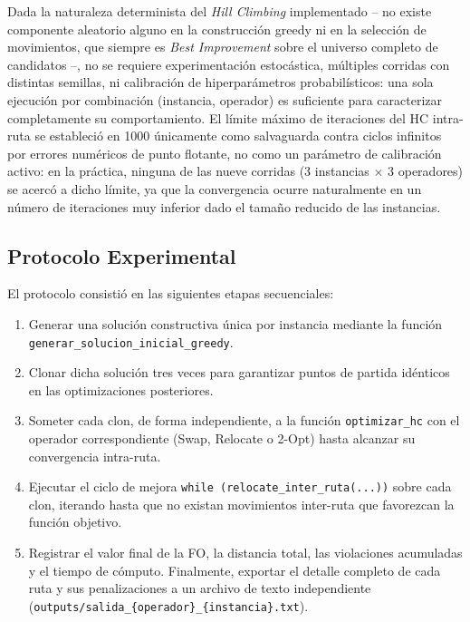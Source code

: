 \documentclass[letter, 10pt]{article}
\begin{document}
Dada la naturaleza determinista del \textit{Hill Climbing} implementado -- no existe componente aleatorio alguno en la construcci\'on greedy ni en la selecci\'on de movimientos, que siempre es \textit{Best Improvement} sobre el universo completo de candidatos --, no se requiere experimentaci\'on estoc\'astica, m\'ultiples corridas con distintas semillas, ni calibraci\'on de hiperpar\'ametros probabil\'isticos: una sola ejecuci\'on por combinaci\'on (instancia, operador) es suficiente para caracterizar completamente su comportamiento. El l\'imite m\'aximo de iteraciones del HC intra-ruta se estableci\'o en 1000 \'unicamente como salvaguarda contra ciclos infinitos por errores num\'ericos de punto flotante, no como un par\'ametro de calibraci\'on activo: en la pr\'actica, ninguna de las nueve corridas (3 instancias $\times$ 3 operadores) se acerc\'o a dicho l\'imite, ya que la convergencia ocurre naturalmente en un n\'umero de iteraciones muy inferior dado el tama\~no reducido de las instancias.

\subsection{Protocolo Experimental}

El protocolo consisti\'o en las siguientes etapas secuenciales:

\begin{enumerate}
    \item Generar una soluci\'on constructiva \'unica por instancia mediante la funci\'on \texttt{generar\_solucion\_inicial\_greedy}.
    \item Clonar dicha soluci\'on tres veces para garantizar puntos de partida id\'enticos en las optimizaciones posteriores.
    \item Someter cada clon, de forma independiente, a la funci\'on \texttt{optimizar\_hc} con el operador correspondiente (Swap, Relocate o 2-Opt) hasta alcanzar su convergencia intra-ruta.
    \item Ejecutar el ciclo de mejora \texttt{while (relocate\_inter\_ruta(...))} sobre cada clon, iterando hasta que no existan movimientos inter-ruta que favorezcan la funci\'on objetivo.
    \item Registrar el valor final de la FO, la distancia total, las violaciones acumuladas y el tiempo de c\'omputo. Finalmente, exportar el detalle completo de cada ruta y sus penalizaciones a un archivo de texto independiente (\texttt{outputs/salida\_\{operador\}\_\{instancia\}.txt}).
\end{enumerate}
\end{document}
